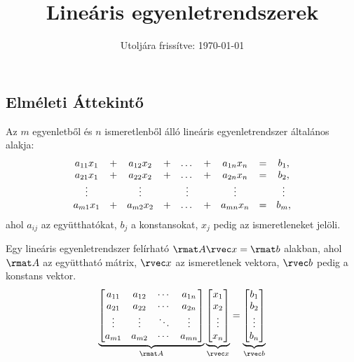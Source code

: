 \documentclass[a4paper, 12pt]{scrartcl}
\title{Lineáris egyenletrendszerek}
\date{Utoljára frissítve: \today}
\begin{document}
\maketitle
\subsection{Elméleti Áttekintő}

\begin{blueBox}
  Az $m$ egyenletből és $n$ ismeretlenből álló lineáris egyenletrendszer
  általános alakja:
  $$
    \begin{array}{*{9}{c}}
      a_{11} x_{1} & + & a_{12} x_{2} & + & \dots  & + & a_{1n} x_{n} & = & b_{1}\text, \\
      a_{21} x_{1} & + & a_{22} x_{2} & + & \dots  & + & a_{2n} x_{n} & = & b_{2}\text, \\
      \vdots       &   & \vdots       &   & \vdots &   & \vdots       &   & \vdots      \\
      a_{m1} x_{1} & + & a_{m2} x_{2} & + & \dots  & + & a_{mn} x_{n} & = & b_{m}\text,
    \end{array}
  $$
  ahol $a_{ij}$ az együtthatókat, $b_{j}$ a konstansokat, $x_{j}$ pedig az
  ismeretleneket jelöli.

  Egy lineáris egyenletrendszer felírható $\rmat A \rvec x = \rmat b$
  alakban, ahol $\rmat A$ az együttható mátrix, $\rvec x$ az ismeretlenek
  vektora, $\rvec b$ pedig a konstans vektor.
  $$
    \underbrace{\begin{bmatrix}
        a_{11} & a_{12} & \cdots & a_{1n} \\
        a_{21} & a_{22} & \cdots & a_{2n} \\
        \vdots & \vdots & \ddots & \vdots \\
        a_{m1} & a_{m2} & \cdots & a_{mn}
      \end{bmatrix}}_{\rmat A} \underbrace{\begin{bmatrix}
        x_{1} \\ x_{2} \\ \vdots \\ x_{n}
      \end{bmatrix}}_{\rvec x} = \underbrace{\begin{bmatrix}
        b_{1} \\ b_{2} \\ \vdots \\ b_{n}
      \end{bmatrix}}_{\rvec b}
  $$
\end{blueBox}
\end{document}
